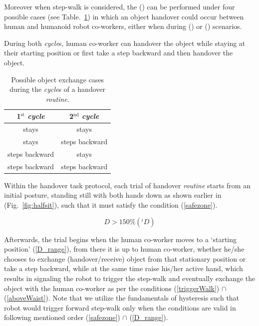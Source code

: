 Moreover when step-walk is considered, the () can be performed under four possible cases (see Table.~\ref{walkTable}) in which an object handover could occur between human and humanoid robot co-workers, either when during () or () scenarios.

\begin{table}[hbt]
	\caption{Possible object exchange cases during the \textit{cycle}s of a handover \textit{routine}.}
	{During both \textit{cycle}s, human co-worker can handover the object while staying at their starting position or first take a step backward and then handover the object.}
	\label{walkTable}
	\begin{center}
		\begin{tabular}{| c | c|}
			\hline  
			{\bf 1${}^\text{st}$ \textit{cycle}} & {\bf 2${}^\text{nd}$ \textit{cycle}} \\ 
			\hline			
			stays &  stays  \\ 
			\hline			
			stays &  steps backward  \\
			\hline			
			steps backward & stays  \\ 
			\hline			
			steps backward & steps backward  \\ 
			\hline 			
		\end{tabular} 
	\end{center}
\end{table}

Within the handover task protocol, each trial of handover \textit{routine} starts from an initial posture, standing still with both hands down as shown earlier in (Fig.~\ref{fig:halfsit}), such that it must satisfy the condition (\ref{safezone}). 

\begin{equation}\label{safezone}
D > 150\% ({}^{i}D) 
\end{equation}


Afterwards, the trial begins when the human co-worker moves to a `starting position' (\ref{D_range}), from there it is up to human co-worker, whether he/she chooses to exchange (handover/receive) object from that stationary position or take a step backward, while at the same time raise his/her active hand, which results in signaling the robot to trigger the step-walk and eventually exchange the object with the human co-worker as per the conditions (\ref{triggerWalk}) $\cap$ (\ref{aboveWaist}). Note that we utilize the fundamentals of hysteresis such that robot would trigger forward step-walk only when the conditions are valid in following mentioned order (\ref{safezone}) $\cap$ (\ref{D_range}).


